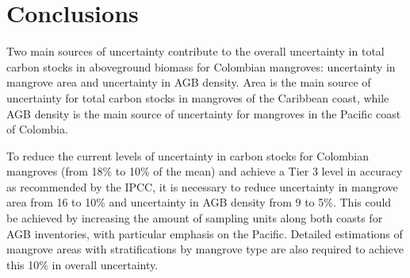 \documentclass[review, authoryear]{elsarticle}   	%
\begin{document}


\section{Conclusions}
Two main sources of uncertainty contribute to the overall uncertainty in total carbon stocks in aboveground biomass for Colombian mangroves: uncertainty in mangrove area and uncertainty in AGB density. 
Area is the main source of uncertainty for total carbon stocks in mangroves of the Caribbean coast, while AGB density is the main source of uncertainty for mangroves in the Pacific coast of Colombia. %

To reduce the current levels of uncertainty in carbon stocks for Colombian mangroves (from 18\% to 10\% of the mean) and achieve a Tier 3 level in accuracy as recommended by the IPCC, it is necessary to reduce uncertainty in mangrove area from 16 to 10\% and uncertainty in AGB density from 9 to 5\%. This could be achieved by increasing the amount of sampling units along both coasts for AGB inventories, with particular emphasis on the Pacific. Detailed estimations of mangrove areas with stratifications by mangrove type are also required to achieve this 10\% in overall uncertainty. 

\end{document}
